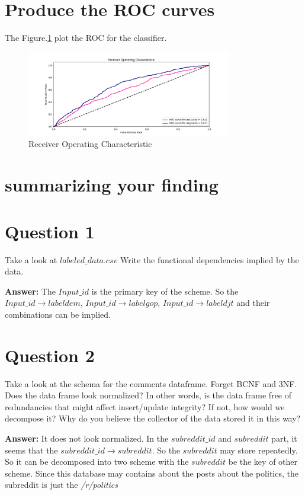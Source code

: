 \documentclass[12pt]{article}
\begin{document}
\section{Produce the ROC curves}
The Figure.\ref{fig:7} plot the ROC for the classifier.
\begin{figure}[!h]
     \begin{center}
                  \includegraphics[width=0.8\textwidth]{../plots/part7.png}
    \end{center}
    \caption{%
       Receiver Operating Characteristic
     }%
   \label{fig:7}
\end{figure}


 
\section {summarizing your finding}
\section {Question 1}
Take a look at $labeled\_data.csv$ Write the functional dependencies implied by the data.

\textbf {Answer:} The $Input\_id$ is the primary key of the scheme. So the $Input\_id \to labeldem$,  $Input\_id \to labelgop$, $Input\_id \to labeldjt$ and their combinations can be implied. 
\section {Question 2}
Take a look at the schema for the comments dataframe. Forget BCNF and 3NF. Does the data frame look normalized? In other words, is the data frame free of redundancies that might affect insert/update integrity? If not, how would we decompose it? Why do you believe the collector of the data stored it in this way?

\textbf{Answer:} It does not look normalized. In the $subreddit\_id$ and $subreddit$ part, it seems that the  $subreddit\_id \to subreddit$. So the $subreddit$ may store repeatedly. So it can be decomposed into two scheme with the $subreddit$ be the key of other scheme. Since this database may contains about the posts about the politics, the subreddit is just the \textit{/r/politics}
\end{document}

